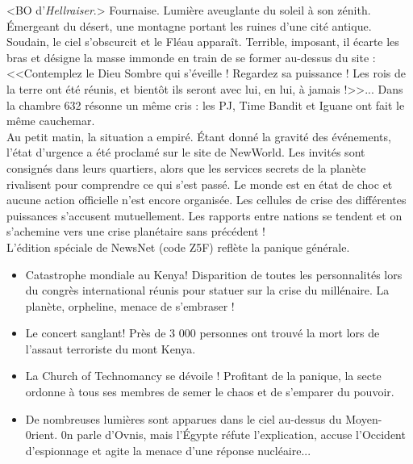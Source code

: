 \documentclass[11pt,twoside,a4paper]{book}
\begin{document}
<BO d'\emph{Hellraiser}.> Fournaise. Lumi{\`e}re aveuglante du soleil {\`a} son z{\'e}nith. {\'E}mergeant du d{\'e}sert, une montagne portant les ruines d'une cit{\'e} antique. Soudain, le ciel s'obscurcit et le Fl{\'e}au appara{\^i}t. Terrible, imposant, il {\'e}carte les bras et d{\'e}signe la masse immonde en train de se former au-dessus du site : <<Contemplez le Dieu Sombre qui s'{\'e}veille ! Regardez sa puissance ! Les rois de la terre ont {\'e}t{\'e} r{\'e}unis, et bient{\^o}t ils seront avec lui, en lui, {\`a} jamais !>>... Dans la chambre 632 r{\'e}sonne un m{\^e}me cris : les PJ, Time Bandit et Iguane ont fait le m{\^e}me cauchemar.~\\

Au petit matin, la situation a empir{\'e}. {\'E}tant donn{\'e} la gravit{\'e} des {\'e}v{\'e}nements, l'{\'e}tat d'urgence a {\'e}t{\'e} proclam{\'e} sur le site de NewWorld. Les invit{\'e}s sont consign{\'e}s dans leurs quartiers, alors que les services secrets de la plan{\`e}te rivalisent pour comprendre ce qui s'est pass{\'e}. Le monde est en {\'e}tat de choc et aucune action officielle n'est encore organis{\'e}e. Les cellules de crise des diff{\'e}rentes puissances s'accusent mutuellement. Les rapports entre nations se tendent et on s'achemine vers une crise plan{\'e}taire sans pr{\'e}c{\'e}dent !~\\

L'{\'e}dition sp{\'e}ciale de NewsNet (code Z5F) refl{\`e}te la panique g{\'e}n{\'e}rale.~\\
\setlength\parindent{20pt}
\begin{itemize}
	\item Catastrophe mondiale au Kenya! Disparition de toutes les personnalit{\'e}s lors du congr{\`e}s international r{\'e}unis pour statuer sur la crise du mill{\'e}naire. La plan{\`e}te, orpheline, menace de s'embraser !
	\item Le concert sanglant! Pr{\`e}s de 3 000 personnes ont trouv{\'e} la mort lors de l'assaut terroriste du mont Kenya.
	\item La Church of Technomancy se d{\'e}voile ! Profitant de la panique, la secte ordonne {\`a} tous ses membres de semer le chaos et de s'emparer du pouvoir.
	\item De nombreuses lumi{\`e}res sont apparues dans le ciel au-dessus du Moyen-0rient. 0n parle d'Ovnis, mais l'{\'E}gypte r{\'e}fute l'explication, accuse l'Occident d'espionnage et agite la menace d'une r{\'e}ponse nucl{\'e}aire...
\end{itemize}~\\
\setlength\parindent{0pt}
\end{document}
